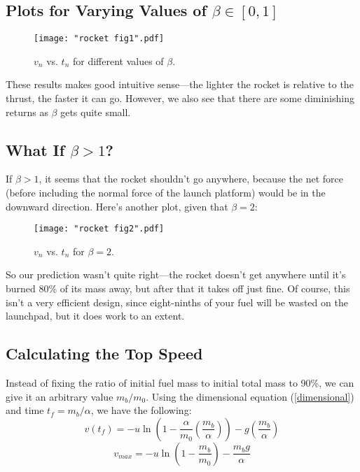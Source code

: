 \documentclass{article}
\begin{document}
\subsection[Plots for Varying Values of Beta Between 0 and 1]{Plots for Varying Values of $\beta \in [0,1]$}

\begin{figure}[H]
	\centering
	\texttt{[image: "rocket fig1".pdf]}
	\caption{$v_n$ vs. $t_n$ for different values of $\beta$.}\label{Fig:VariableBetaPlot}
\end{figure}

These results makes good intuitive sense---the lighter the rocket is relative to the thrust, the faster it can go. However, we also see that there are some diminishing returns as $\beta$ gets quite small.

\subsection[What If Beta is Greater than One?]{What If $\beta > 1$?}

If $\beta > 1$, it seems that the rocket shouldn't go anywhere, because the net force (before including the normal force of the launch platform) would be in the downward direction. Here's another plot, given that $\beta = 2$:
\begin{figure}[H]
	\centering
	\texttt{[image: "rocket fig2".pdf]}
	\caption{$v_n$ vs. $t_n$ for $\beta = 2$.}\label{Fig:BigBetaPlot}
\end{figure}

So our prediction wasn't quite right---the rocket doesn't get anywhere until it's burned 80\% of its mass away, but after that it takes off just fine. Of course, this isn't a very efficient design, since eight-ninths of your fuel will be wasted on the launchpad, but it does work to an extent.

\subsection{Calculating the Top Speed}

Instead of fixing the ratio of initial fuel mass to initial total mass to 90\%, we can give it an arbitrary value $m_b/m_0$. Using the dimensional equation (\ref{dimensional}) and time $t_f = m_b/\alpha$, we have the following:
\begin{equation*}
v(t_f) = -u\ln\left(1 - \frac{\alpha}{m_0}\left(\frac{m_b}{\alpha}\right)\right)-g\left(\frac{m_b}{\alpha}\right)
\end{equation*}
\begin{equation}
v_{max} = -u\ln\left(1 - \frac{m_b}{m_0}\right) - \frac{m_b g}{\alpha}
\end{equation}
\end{document}
